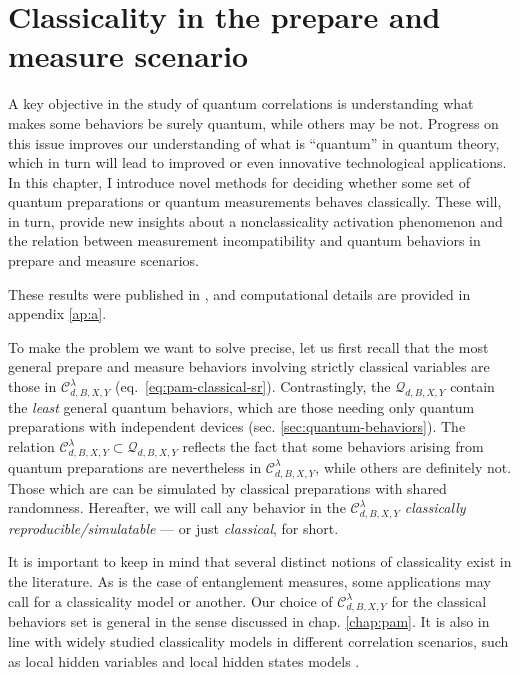 \chapter{Classicality in the prepare and measure scenario}
\label{chap:pam-classical}

    A key objective in the study of quantum correlations is understanding what makes some behaviors be surely quantum, while others may be not. Progress on this issue improves our understanding of what is ``quantum'' in quantum theory, which in turn will lead to improved or even innovative technological applications. In this chapter, I introduce novel methods for deciding whether some set of quantum preparations or quantum measurements behaves classically. These will, in turn, provide new insights about a nonclassicality activation phenomenon and the relation between measurement incompatibility and quantum behaviors in prepare and measure scenarios.

    These results were published in \cite{degois_2021_general}, and computational details are provided in appendix \ref{ap:a}.

    \ornamentbreak

    To make the problem we want to solve precise, let us first recall that  the most general prepare and measure behaviors involving strictly classical variables are those in $\mathcal{C}^\lambda_{d,B,X,Y}$ (eq.~\eqref{eq:pam-classical-sr}).  Contrastingly, the $\mathcal{Q}_{d,B,X,Y}$ contain the \emph{least} general quantum behaviors, which are those needing only quantum preparations with independent devices (sec. \ref{sec:quantum-behaviors}). The relation $\mathcal{C}_{d,B,X,Y}^\lambda \subset \mathcal{Q}_{d,B,X,Y}$  reflects the fact that some behaviors arising from quantum preparations are nevertheless in $\mathcal{C}_{d,B,X,Y}^\lambda$, while others are definitely not. Those which are can be simulated by classical preparations with shared randomness. Hereafter, we will call any behavior in the $\mathcal{C}^\lambda_{d,B,X,Y}$ \emph{classically reproducible/simulatable} --- or just \emph{classical}, for short.

    It is important to keep in mind that several distinct notions of classicality exist in the literature. As is the case of entanglement measures, some applications may call for a classicality model or another. Our choice of $\mathcal{C}_{d,B,X,Y}^\lambda$ for the classical behaviors set is general in the sense discussed in chap. \ref{chap:pam}. It is also in line with widely studied classicality models in different correlation scenarios, such as local hidden variables and local hidden states models \cite{brunner_2014_nonlocality,uola_2020_steering,cavalcanti_2016_steering}.

